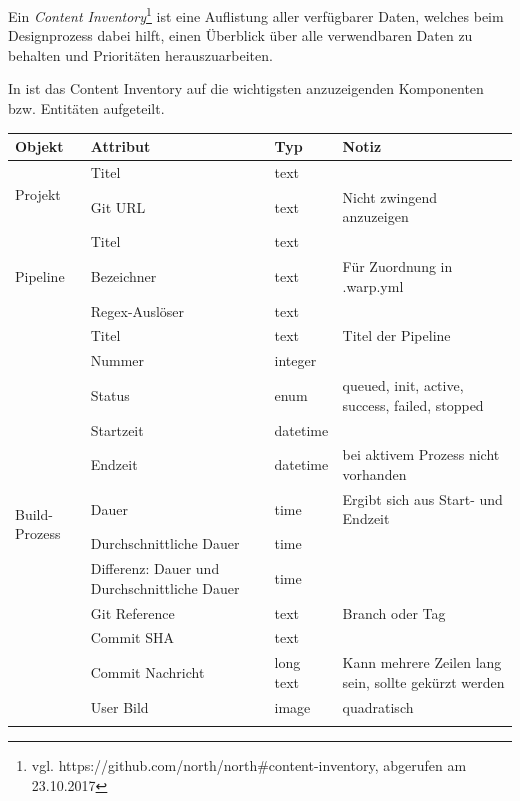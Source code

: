 Ein \emph{Content Inventory}\footnote{vgl. https://github.com/north/north\#content-inventory, abgerufen am 23.10.2017} ist eine Auflistung aller verfügbarer Daten, welches beim De\-sign\-pro\-zess dabei hilft, einen Überblick über alle verwendbaren Daten zu behalten und Prioritäten herauszuarbeiten.

In  ist das Content Inventory auf die wichtigsten anzuzeigenden Komponenten bzw. Entitäten aufgeteilt.

\begin{table}[H]
  \scriptsize
  \begin{tabularx}{\textwidth}{| l | p{4cm} | l | X |}
    \hline
    \textbf{Objekt} & \textbf{Attribut} & \textbf{Typ} & \textbf{Notiz} \\ \hline
    \multirow{2}{*}{Projekt} & Titel & text &  \\ \cline{2-4}
      & Git URL & text & Nicht zwingend anzuzeigen \\ \hline
    \multirow{3}{*}{Pipeline} & Titel & text &  \\ \cline{2-4}
      & Bezeichner & text & Für Zuordnung in .warp.yml \\ \cline{2-4}
      & Regex-Auslöser & text &   \\ \hline
    \multirow{13}{*}{Build-Prozess} & Titel & text & Titel der Pipeline \\ \cline{2-4}
      & Nummer & integer &  \\ \cline{2-4}
      & Status & enum & queued, init, active, success, failed, stopped \\ \cline{2-4}
      & Startzeit & datetime &  \\ \cline{2-4}
      & Endzeit & datetime & bei aktivem Prozess nicht vorhanden \\ \cline{2-4}
      & Dauer & time & Ergibt sich aus Start- und Endzeit \\ \cline{2-4}
      & Durchschnittliche Dauer & time &  \\ \cline{2-4}
      & Differenz: Dauer und Durchschnittliche Dauer & time &  \\ \cline{2-4}
      & Git Reference & text & Branch oder Tag \\ \cline{2-4}
      & Commit SHA & text &  \\ \cline{2-4}
      & Commit Nachricht & long text & Kann mehrere Zeilen lang sein, sollte gekürzt werden \\ \cline{2-4}
      & User Bild & image & quadratisch \\ \cline{2-4}

\end{tabularx}
\end{table}
